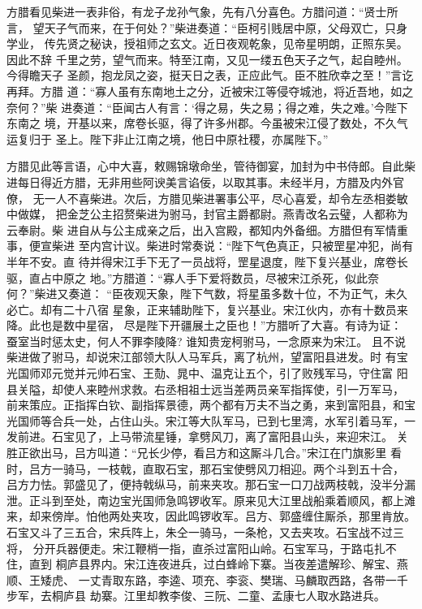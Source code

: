 方腊看见柴进一表非俗，有龙子龙孙气象，先有八分喜色。方腊问道：“贤士所言，
望天子气而来，在于何处？”柴进奏道：“臣柯引贱居中原，父母双亡，只身学业，
传先贤之秘诀，授祖师之玄文。近日夜观乾象，见帝星明朗，正照东吴。因此不辞
千里之劳，望气而来。特至江南，又见一缕五色天子之气，起自睦州。今得瞻天子
圣颜，抱龙凤之姿，挺天日之表，正应此气。臣不胜欣幸之至！”言讫再拜。方腊
道：“寡人虽有东南地土之分，近被宋江等侵夺城池，将近吾地，如之奈何？”柴
进奏道：“臣闻古人有言：‘得之易，失之易；得之难，失之难。’今陛下东南之
境，开基以来，席卷长驱，得了许多州郡。今虽被宋江侵了数处，不久气运复归于
圣上。陛下非止江南之境，他日中原社稷，亦属陛下。”

方腊见此等言语，心中大喜，敕赐锦墩命坐，管待御宴，加封为中书侍郎。自此柴
进每日得近方腊，无非用些阿谀美言谄佞，以取其事。未经半月，方腊及内外官僚，
无一人不喜柴进。次后，方腊见柴进署事公平，尽心喜爱，却令左丞相娄敏中做媒，
把金芝公主招赘柴进为驸马，封官主爵都尉。燕青改名云璧，人都称为云奉尉。柴
进自从与公主成亲之后，出入宫殿，都知内外备细。方腊但有军情重事，便宣柴进
至内宫计议。柴进时常奏说：“陛下气色真正，只被罡星冲犯，尚有半年不安。直
待并得宋江手下无了一员战将，罡星退度，陛下复兴基业，席卷长驱，直占中原之
地。”方腊道：“寡人手下爱将数员，尽被宋江杀死，似此奈何？”柴进又奏道：
“臣夜观天象，陛下气数，将星虽多数十位，不为正气，未久必亡。却有二十八宿
星象，正来辅助陛下，复兴基业。宋江伙内，亦有十数员来降。此也是数中星宿，
尽是陛下开疆展土之臣也！”方腊听了大喜。有诗为证：
蚕室当时惩太史，何人不罪李陵降?
谁知贵宠柯驸马，一念原来为宋江。
且不说柴进做了驸马，却说宋江部领大队人马军兵，离了杭州，望富阳县进发。时
有宝光国师邓元觉并元帅石宝、王𪟝、晁中、温克让五个，引了败残军马，守住富
阳县关隘，却使人来睦州求救。右丞相祖士远当差两员亲军指挥使，引一万军马，
前来策应。正指挥白钦、副指挥景德，两个都有万夫不当之勇，来到富阳县，和宝
光国师等合兵一处，占住山头。宋江等大队军马，已到七里湾，水军引着马军，一
发前进。石宝见了，上马带流星锤，拿劈风刀，离了富阳县山头，来迎宋江。
关胜正欲出马，吕方叫道：“兄长少停，看吕方和这厮斗几合。”宋江在门旗影里
看时，吕方一骑马，一枝戟，直取石宝，那石宝使劈风刀相迎。两个斗到五十合，
吕方力怯。郭盛见了，便持戟纵马，前来夹攻。那石宝一口刀战两枝戟，没半分漏
泄。正斗到至处，南边宝光国师急鸣锣收军。原来见大江里战船乘着顺风，都上滩
来，却来傍岸。怕他两处夹攻，因此鸣锣收军。吕方、郭盛缠住厮杀，那里肯放。
石宝又斗了三五合，宋兵阵上，朱仝一骑马，一条枪，又去夹攻。石宝战不过三将，
分开兵器便走。宋江鞭梢一指，直杀过富阳山岭。石宝军马，于路屯扎不住，直到
桐庐县界内。宋江连夜进兵，过白蜂岭下寨。当夜差遣解珍、解宝、燕顺、王矮虎、
一丈青取东路，李逵、项充、李衮、樊瑞、马麟取西路，各带一千步军，去桐庐县
劫寨。江里却教李俊、三阮、二童、孟康七人取水路进兵。

